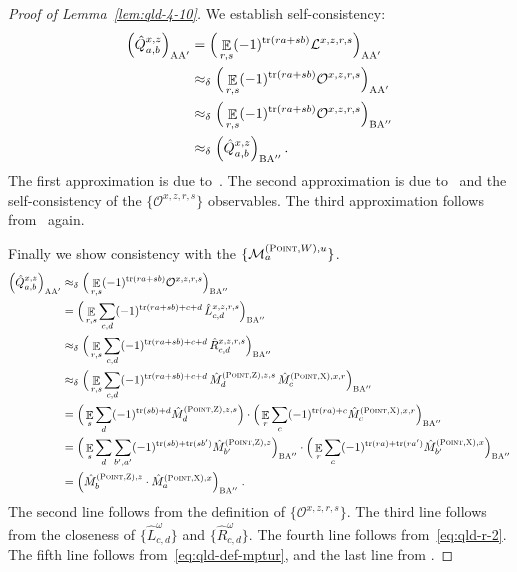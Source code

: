 \documentclass[11pt]{article}
\theoremstyle{definition}
\DeclareMathOperator{\tr}{tr}
\newcommand{\E}{\mathop{\mathbb{E}}\displaylimits}
\newcommand{\labelstyle}[1]{\ensuremath{\textsc{#1}}\xspace}
\newcommand{\xpt}{\labelstyle{X}}
\newcommand{\zpt}{\labelstyle{Z}}
\newcommand{\alice}{\labelstyle{A}}
\newcommand{\bob}{\labelstyle{B}}
\newcommand{\typestyle}[1]{\ensuremath{\textsc{#1}}\xspace}
\newcommand{\Point}{\typestyle{Point}}
\begin{document}
\begin{proof}[Proof of Lemma~\ref{lem:qld-4-10}]
	We establish self-consistency:
	\begin{align*}
		\Big( \hat{Q}^{x,z}_{a,b} \Big)_{\alice \alice'} &= \Big( \E_{r,s} (-1)^{\tr(ra + sb)} \mathcal{L}^{x,z,r,s} \Big)_{\alice \alice'} \\
		&\approx_\delta \Big( \E_{r,s} (-1)^{\tr(ra + sb)} \mathcal{O}^{x,z,r,s} \Big)_{\alice \alice'} \\
		&\approx_\delta \Big( \E_{r,s} (-1)^{\tr(ra + sb)} \mathcal{O}^{x,z,r,s} \Big)_{\bob \alice''} \\
		&\approx_\delta \Big( \hat{Q}^{x,z}_{a,b} \Big)_{\bob \alice''}\,.
	\end{align*}
	The first approximation is due to~. The second approximation is due to~ and the self-consistency of the $\{\mathcal{O}^{x,z,r,s}\}$ observables. The third approximation follows from~ again. 
	
	Finally we show consistency with the $\{ \mathcal{M}^{(\Point,W),u}_a\}$. 
	\begin{align*}
		\Big( \hat{Q}^{x,z}_{a,b} \Big)_{\alice \alice'}&\approx_\delta \Big( \E_{r,s} (-1)^{\tr(ra + sb)} \mathcal{O}^{x,z,r,s} \Big)_{\bob \alice''} \\
		&= \Big( \E_{r,s} \sum_{c,d} (-1)^{\tr(ra + sb) + c + d} \, \hat{L}^{x,z,r,s}_{c,d}  \Big)_{\bob \alice''} \\
		&\approx_\delta \Big( \E_{r,s} \sum_{c,d} (-1)^{\tr(ra + sb) + c + d} \, \hat{R}^{x,z,r,s}_{c,d}  \Big)_{\bob \alice''} \\
		&\approx_\delta \Big( \E_{r,s} \sum_{c,d} (-1)^{\tr(ra + sb) + c + d} \, \hat{M}^{(\Point,\zpt),z,s}_d \, \hat{M}^{(\Point,\xpt),x,r}_c \Big)_{\bob \alice''} \\
                                                                &= \Big ( \E_s \sum_d (-1)^{\tr(sb) + d} \hat{M}^{(\Point,\zpt),z,s}_d \Big) \cdot \Big (\E_r \sum_c (-1)^{\tr(ra) + c} \hat{M}^{(\Point,\xpt),x,r}_c  \Big)_{\bob \alice''} \\
                                                                &= \Big( \E_s \sum_d \sum_{b', a'}  (-1)^{\tr(sb) + \tr(sb')} \hat{M}^{(\Point, \zpt), z}_{b'} \Big)_{\bob \alice''} \cdot \Big( \E_r \sum_c (-1)^{\tr(ra) + \tr(r a')} \hat{M}^{(\Point, \xpt), x}_{b'} \Big)_{\bob \alice''} \\
		&= \Big ( \hat{M}^{(\Point,\zpt),z}_b \cdot \hat{M}^{(\Point,\xpt),x}_a \Big)_{\bob \alice''}\;.
	\end{align*}
	The second line follows from the definition of $\{ \mathcal{O}^{x,z,r,s} \}$. The third line follows from the closeness of $\{\hat{L}^\omega_{c,d}\}$ and $\{\hat{R}^\omega_{c,d} \}$. The fourth line follows from~\eqref{eq:qld-r-2}.  The fifth line follows from~\eqref{eq:qld-def-mptur}, and the last line from .


\end{proof}
\end{document}
